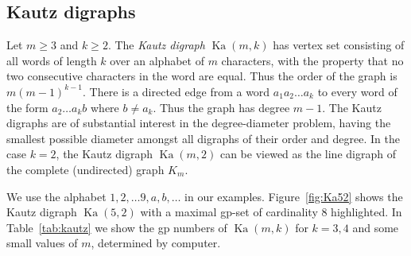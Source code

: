 \documentclass[a4paper,12pt]{article}
\theoremstyle{definition}
\DeclareMathOperator{\Ka}{Ka}
\begin{document}
	
	
	
	\subsection{Kautz digraphs}
	Let $m\geq 3$ and $k\geq 2$. The \emph{Kautz digraph} $\Ka(m,k)$ has vertex set consisting of all words of length $k$ over an alphabet of $m$ characters, with the property that no two consecutive characters in the word are equal. Thus the order of the graph is $m(m-1)^{k-1}$. There is a directed edge from a word $a_1 a_2\ldots a_k$ to every word of the form $a_2\ldots a_k b$ where $b\neq a_k$. Thus the graph has degree $m-1$. The Kautz digraphs are of substantial interest in the degree-diameter problem, having the smallest possible diameter amongst all digraphs of their order and degree. In the case $k=2$, the Kautz digraph $\Ka(m,2)$ can be viewed as the line digraph of the complete (undirected) graph $K_m$.
	
	We use the alphabet $1,2,\ldots 9,a,b,\ldots$ in our examples. Figure~\ref{fig:Ka52} shows the Kautz digraph $\Ka(5,2)$ with a maximal gp-set of cardinality 8 highlighted. In Table~\ref{tab:kautz} we show the gp numbers of $\Ka(m,k)$ for $k = 3,4$ and some small values of $m$, determined by computer. 
	
\end{document}
